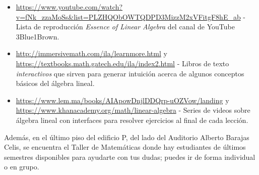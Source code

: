 \documentclass[12pt]{article}
\begin{document}
\begin{itemize}
    \item \url{https://www.youtube.com/watch?v=fNk_zzaMoSs&list=PLZHQObOWTQDPD3MizzM2xVFitgF8hE_ab} - Lista de reproducción \textit{Essence of Linear Algebra} del canal de YouTube 3Blue1Brown.
    \item \url{http://immersivemath.com/ila/learnmore.html} y \url{https://textbooks.math.gatech.edu/ila/index2.html} - Libros de texto \emph{interactivos} que sirven para generar intuición acerca de algunos conceptos básicos del álgebra lineal.
    \item \url{https://www.lem.ma/books/AIApowDnjlDDQrp-uOZVow/landing} y \url{https://www.khanacademy.org/math/linear-algebra} - Series de videos sobre álgebra lineal con interfaces para resolver ejercicios al final de cada lección.
\end{itemize}

Además, en el último piso del edificio P, del lado del Auditorio Alberto Barajas Celis, se encuentra el Taller de Matemáticas donde hay estudiantes de últimos semestres disponibles para ayudarte con tus dudas; puedes ir de forma individual o en grupo.

\newpage
\end{document}
